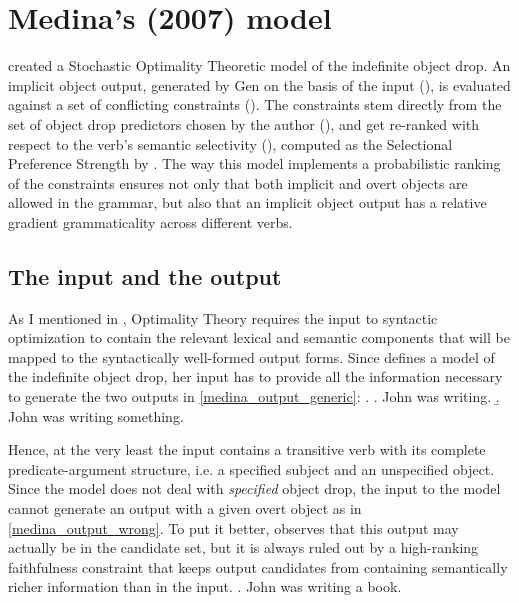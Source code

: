 \setchapterpreamble[u]{\margintoc}
\chapter{Medina's (2007) model}


\textcite{Medina2007} created a Stochastic Optimality Theoretic model of the indefinite object drop. An implicit object output, generated by Gen on the basis of the input (), is evaluated against a set of conflicting constraints (). The constraints stem directly from the set of object drop predictors chosen by the author (), and get re-ranked with respect to the verb's semantic selectivity (), computed as the Selectional Preference Strength by \textcite{Resnik1993, Resnik1996}. The way this model implements a probabilistic ranking of the constraints ensures not only that both implicit and overt objects are allowed in the grammar, but also that an implicit object output has a relative gradient grammaticality across different verbs.


\section{The input and the output} 

As I mentioned in , Optimality Theory requires the input to syntactic optimization to contain the relevant lexical and semantic components that will be mapped to the syntactically well-formed output forms. Since \textcite{Medina2007} defines a model of the indefinite object drop, her input has to provide all the information necessary to generate the two outputs in  \ref{medina_output_generic}:
\ex. \label{medina_output_generic} \a. John was writing.
\b. John was writing something.

Hence, at the very least the input contains a transitive verb with its complete predicate-argument structure, i.e. a specified subject and an unspecified object. Since the model does not deal with \textit{specified} object drop, the input to the model cannot generate an output with a given overt object as in \ref{medina_output_wrong}. To put it better, \textcite[70-71]{Medina2007} observes that this output may actually be in the candidate set, but it is always ruled out by a high-ranking faithfulness constraint that keeps output candidates from containing semantically richer information than in the input.
\ex. \label{medina_output_wrong} John was writing a book.

